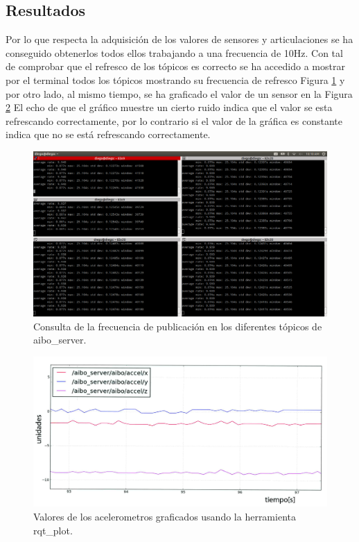 \documentclass[12pt,a4paper,final,twoside]{book}
\begin{document}
\subsection{Resultados}

Por lo que respecta la adquisición de los valores de sensores y articulaciones se ha conseguido obtenerlos todos ellos trabajando a una frecuencia de 10Hz. Con tal de comprobar que el refresco de los tópicos es correcto se ha accedido a mostrar por el terminal todos los tópicos mostrando su frecuencia de refresco Figura \ref{fig:getT} y por otro lado, al mismo tiempo, se ha graficado el valor de un sensor en la Figura \ref{fig:addacc} El echo de que el gráfico muestre un cierto ruido indica que el valor se esta refrescando correctamente, por lo contrario si el valor de la gráfica es constante indica que no se está refrescando correctamente.

\begin{figure}[H]
    \includegraphics[scale=0.3]{images/getTopics.png}
	 \caption{Consulta de la frecuencia de publicación en los diferentes tópicos de aibo{\_}server.}
  \label{fig:getT}
\end{figure}

\begin{figure}[H]
	\centering
    \includegraphics[scale=0.2]{images/accel.jpg}
	 \caption{Valores de los acelerometros graficados usando la herramienta rqt{\_}plot.}
  \label{fig:addacc}
\end{figure}
\end{document}
